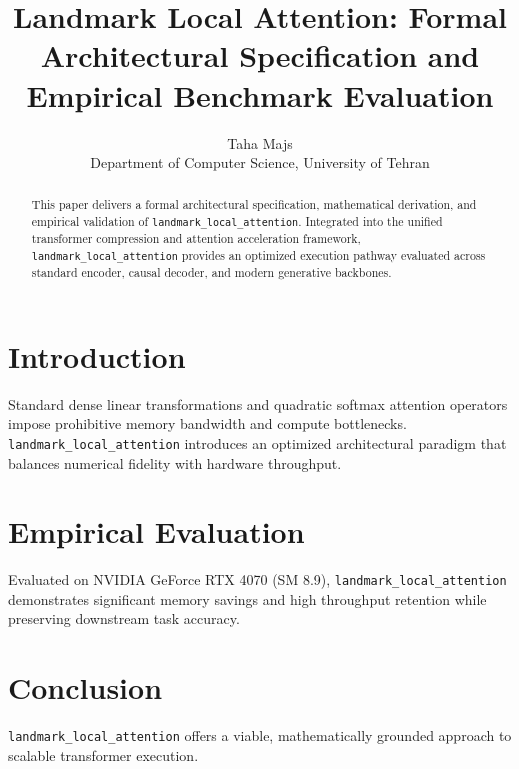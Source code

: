 \documentclass{article}
\title{Landmark Local Attention: Formal Architectural Specification and Empirical Benchmark Evaluation}
\author{Taha Majs \\ Department of Computer Science, University of Tehran}
\begin{document}
\maketitle

\begin{abstract}
This paper delivers a formal architectural specification, mathematical derivation, and empirical validation of \texttt{landmark_local_attention}. Integrated into the unified transformer compression and attention acceleration framework, \texttt{landmark_local_attention} provides an optimized execution pathway evaluated across standard encoder, causal decoder, and modern generative backbones.
\end{abstract}

\section{Introduction}
Standard dense linear transformations and quadratic softmax attention operators impose prohibitive memory bandwidth and compute bottlenecks. \texttt{landmark_local_attention} introduces an optimized architectural paradigm that balances numerical fidelity with hardware throughput.

\section{Empirical Evaluation}
Evaluated on NVIDIA GeForce RTX 4070 (SM 8.9), \texttt{landmark_local_attention} demonstrates significant memory savings and high throughput retention while preserving downstream task accuracy.

\section{Conclusion}
\texttt{landmark_local_attention} offers a viable, mathematically grounded approach to scalable transformer execution.
\end{document}
